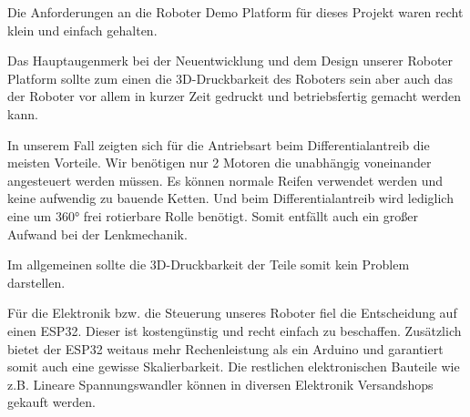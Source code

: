 \begin{flushleft}
    Die Anforderungen an die Roboter Demo Platform für dieses Projekt waren recht klein und einfach gehalten.

    Das Hauptaugenmerk bei der Neuentwicklung und dem Design unserer Roboter Platform sollte zum einen 
    die 3D-Druckbarkeit des Roboters sein aber auch das der Roboter vor allem in kurzer Zeit gedruckt und betriebsfertig gemacht 
    werden kann.

    In unserem Fall zeigten sich für die Antriebsart beim Differentialantreib die meisten Vorteile.
    Wir benötigen nur 2 Motoren die unabhängig voneinander angesteuert werden müssen. Es können normale
    Reifen verwendet werden und keine aufwendig zu bauende Ketten. Und beim Differentialantreib wird lediglich eine
    um 360° frei rotierbare Rolle benötigt.
    Somit entfällt auch ein großer Aufwand bei der Lenkmechanik. 

    Im allgemeinen sollte die 3D-Druckbarkeit der Teile somit kein Problem darstellen. 

    Für die Elektronik bzw. die Steuerung unseres Roboter fiel die Entscheidung auf einen ESP32. 
    Dieser ist kostengünstig und recht einfach zu beschaffen. 
    Zusätzlich bietet der ESP32 weitaus mehr Rechenleistung als ein Arduino und garantiert somit auch eine gewisse Skalierbarkeit.
    Die restlichen elektronischen Bauteile wie z.B. Lineare Spannungswandler können in diversen Elektronik Versandshops gekauft werden.
    
\end{flushleft}
